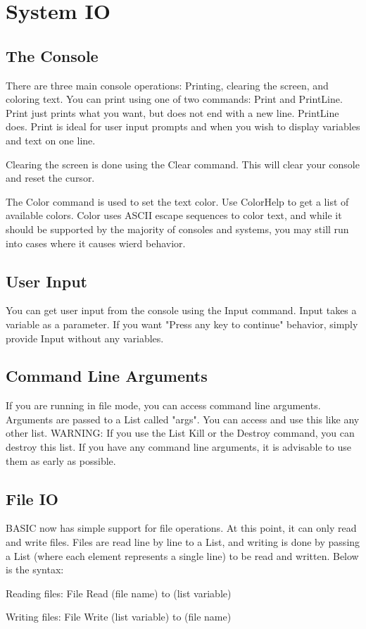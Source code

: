 \documentclass{report}
\begin{document}
\chapter{System IO}

\section{The Console}

There are three main console operations: Printing, clearing the screen, and coloring text. You can print using one of two commands: Print and PrintLine. Print just prints what you want, but does not end with a new line. PrintLine does. Print is ideal for user input prompts and when you wish to display variables and text on one line.

Clearing the screen is done using the Clear command. This will clear your console and reset the cursor.

The Color command is used to set the text color. Use ColorHelp to get a list of available colors. Color uses ASCII escape sequences to color text, and while it should be supported by the majority of consoles and systems, you may still run into cases where it causes wierd behavior.

\section{User Input}

You can get user input from the console using the Input command. Input takes a variable as a parameter. If you want "Press any key to continue" behavior, simply provide Input without any variables.

\section{Command Line Arguments}

If you are running in file mode, you can access command line arguments. Arguments are passed to a List called "args". You can access and use this like any other list.
WARNING: If you use the List Kill or the Destroy command, you can destroy this list. If you have any command line arguments, it is advisable to use them as early as possible.

\section{File IO}

BASIC now has simple support for file operations. At this point, it can only read and write files. Files are read line by line to a List, and writing is done by passing a List (where each element represents a single line) to be read and written. Below is the syntax:

Reading files:
File Read (file name) to (list variable)

Writing files:
File Write (list variable) to (file name)
\end{document}
